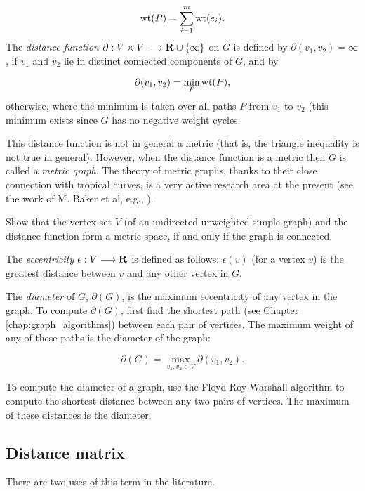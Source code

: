 \[
{\rm wt}(P)=\sum_{i=1}^m {\rm wt}(e_i).
\]
The {\it distance function} $\partial:V\times V \longrightarrow  \mathbf{R}\cup
\{\infty\}$ on
$G$ is defined by $\partial(v_1,v_2) = \infty$,
if $v_1$ and $v_2$ lie in distinct connected
components of $G$, and by

\[
\partial(v_1,v_2) =
\min_P {\rm wt}(P),
\]
otherwise, where the minimum is taken over all paths $P$
from $v_1$ to $v_2$ (this minimum exists since
$G$ has no negative weight cycles.

This distance function is not in general a metric
(that is, the triangle inequality is not true in general).
However, when the distance function is a
metric then $G$ is called a {\it metric graph}.
The theory of metric graphs, thanks to their close
connection with tropical curves, is a very active
research area at the present (see the work of
M. Baker et al, e.g., \cite{BakerFaber2006}).

\begin{exercise}
Show that the vertex set $V$ (of an undirected unweighted simple graph)
and the distance function form
a metric space, if and only if the graph is connected.
\end{exercise}

The {\it eccentricity} $\epsilon:V \longrightarrow  \mathbf{R}$ is defined as follows:
$\epsilon (v)$ (for a vertex $v$) is the greatest distance between $v$
and any other vertex in $G$.

The {\it diameter} of $G$, $\partial(G)$, is the maximum
eccentricity of any vertex in the graph. To compute
$\partial(G)$, first find the shortest path (see Chapter
\ref{chap:graph_algorithms}) between each pair of
vertices. The maximum weight of any of
these paths is the diameter of the graph:

\[
\partial(G) = \max_{v_1,v_2\in V} \partial(v_1,v_2).
\]

To compute the diameter of a graph, use the Floyd-Roy-Warshall
algorithm to compute the shortest distance between any
two pairs of vertices. The maximum of these distances is the
diameter.



\subsection{Distance matrix}

There are two uses of this term in the literature.

